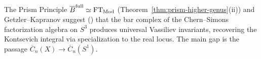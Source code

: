 \begin{remark}
\label{rem:vassiliev}
The Prism Principle $\overline{B}^{\mathrm{full}} \simeq \mathrm{FT}_{\mathrm{Mod}}$ (Theorem~\ref{thm:prism-higher-genus}(ii)) and Getzler--Kapranov \cite{GeK98} suggest (\ClaimStatusConjectured) that the bar complex of the Chern--Simons factorization algebra on $S^3$ produces universal Vassiliev invariants, recovering the Kontsevich integral via specialization to the real locus.  The main gap is the passage $\overline{C}_n(X) \to \overline{C}_n(S^1)$.
\end{remark}

